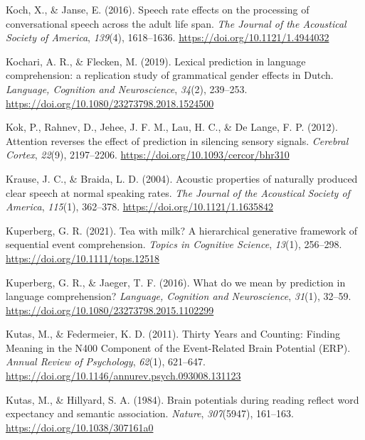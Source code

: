\documentclass[a4paper, nobind]{templates/ociamthesis}
\newlength{\cslhangindent}
\newenvironment{CSLReferences}[2] %
 {%
  \setlength{\parindent}{0pt}
  \ifodd #1
  \let\oldpar\par
  \def\par{\hangindent=\cslhangindent\oldpar}
  \fi
  \setlength{\parskip}{1mm}
  \setlength{\baselineskip}{6mm}
 }%
 {}
\begin{document}
\begin{CSLReferences}{1}{0}
\leavevmode{}%
Koch, X., \& Janse, E. (2016). {Speech rate effects on the processing of conversational speech across the adult life span}. \emph{The Journal of the Acoustical Society of America}, \emph{139}(4), 1618--1636. \url{https://doi.org/10.1121/1.4944032}

\leavevmode{}%
Kochari, A. R., \& Flecken, M. (2019). {Lexical prediction in language comprehension: a replication study of grammatical gender effects in Dutch}. \emph{Language, Cognition and Neuroscience}, \emph{34}(2), 239--253. \url{https://doi.org/10.1080/23273798.2018.1524500}

\leavevmode{}%
Kok, P., Rahnev, D., Jehee, J. F. M., Lau, H. C., \& De Lange, F. P. (2012). {Attention reverses the effect of prediction in silencing sensory signals}. \emph{Cerebral Cortex}, \emph{22}(9), 2197--2206. \url{https://doi.org/10.1093/cercor/bhr310}

\leavevmode{}%
Krause, J. C., \& Braida, L. D. (2004). {Acoustic properties of naturally produced clear speech at normal speaking rates}. \emph{The Journal of the Acoustical Society of America}, \emph{115}(1), 362--378. \url{https://doi.org/10.1121/1.1635842}

\leavevmode{}%
Kuperberg, G. R. (2021). {Tea with milk? A hierarchical generative framework of sequential event comprehension}. \emph{Topics in Cognitive Science}, \emph{13}(1), 256--298. \url{https://doi.org/10.1111/tops.12518}

\leavevmode{}%
Kuperberg, G. R., \& Jaeger, T. F. (2016). What do we mean by prediction in language comprehension? \emph{Language, Cognition and Neuroscience}, \emph{31}(1), 32--59. \url{https://doi.org/10.1080/23273798.2015.1102299}

\leavevmode{}%
Kutas, M., \& Federmeier, K. D. (2011). Thirty Years and Counting: Finding Meaning in the N400 Component of the Event-Related Brain Potential (ERP). \emph{Annual Review of Psychology}, \emph{62}(1), 621--647. \url{https://doi.org/10.1146/annurev.psych.093008.131123}

\leavevmode{}%
Kutas, M., \& Hillyard, S. A. (1984). Brain potentials during reading reflect word expectancy and semantic association. \emph{Nature}, \emph{307}(5947), 161--163. \url{https://doi.org/10.1038/307161a0}


\end{CSLReferences}
\end{document}
